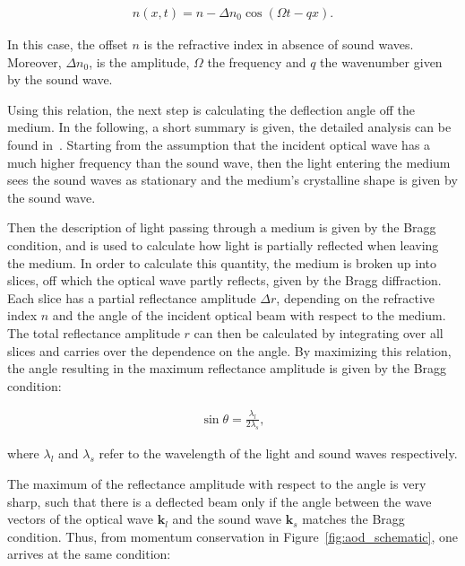 \begin{align}
	n(x, t) = n - \Delta n_0 \cos{\left(\Omega t - q x\right)}.
\end{align}

In this case, the offset $n$ is the refractive index in absence of sound waves. Moreover, $\Delta n_0$, is the amplitude, $\Omega$ the frequency and $q$ the wavenumber given by the sound wave.

Using this relation, the next step is calculating the deflection angle off the medium. In the following, a short summary is given, the detailed analysis can be found in~\cite{Saleh1991}. Starting from the assumption that the incident optical wave has a much higher frequency than the sound wave, then the light entering the medium sees the sound waves as stationary and the medium's crystalline shape is given by the sound wave.

Then the description of light passing through a medium is given by the Bragg condition, and is used to calculate how light is partially reflected when leaving the medium. In order to calculate this quantity, the medium is broken up into slices, off which the optical wave partly reflects, given by the Bragg diffraction. Each slice has a partial reflectance amplitude $\Delta r$, depending on the refractive index $n$ and the angle of the incident optical beam with respect to the medium. The total reflectance amplitude $r$ can then be calculated by integrating over all slices and carries over the dependence on the angle. By maximizing this relation, the angle resulting in the maximum reflectance amplitude is given by the Bragg condition:


\begin{align}
	\sin \theta = \frac{\lambda_l}{2 \lambda_s},
\end{align}

where $\lambda_l$ and $\lambda_s$ refer to the wavelength of the light and sound waves respectively.

The maximum of the reflectance amplitude with respect to the angle is very sharp, such that there is a deflected beam only if the angle between the wave vectors of the optical wave $\mathbf{k}_l$ and the sound wave $\mathbf{k}_s$ matches the Bragg condition. Thus, from momentum conservation in Figure~\ref{fig:aod_schematic}, one arrives at the same condition:

